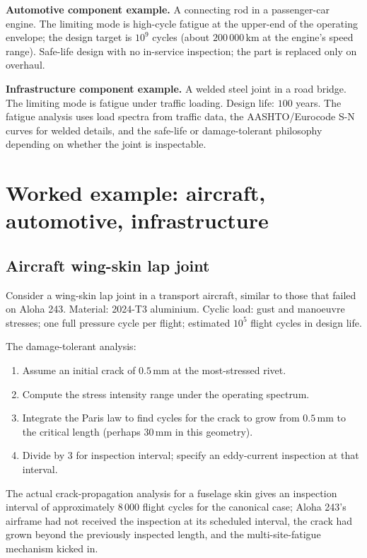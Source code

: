 \textbf{Automotive component example.} A connecting rod in a passenger-car engine. The limiting mode is high-cycle fatigue at the upper-end of the operating envelope; the design target is $10^9$ cycles (about $200\,000\,\si{\kilo\meter}$ at the engine's speed range). Safe-life design with no in-service inspection; the part is replaced only on overhaul.

\textbf{Infrastructure component example.} A welded steel joint in a road bridge. The limiting mode is fatigue under traffic loading. Design life: $100$ years. The fatigue analysis uses load spectra from traffic data, the AASHTO/Eurocode S-N curves for welded details, and the safe-life or damage-tolerant philosophy depending on whether the joint is inspectable.

\section{Worked example: aircraft, automotive, infrastructure}

\subsection{Aircraft wing-skin lap joint}

Consider a wing-skin lap joint in a transport aircraft, similar to those that failed on Aloha 243. Material: 2024-T3 aluminium. Cyclic load: gust and manoeuvre stresses; one full pressure cycle per flight; estimated $10^5$ flight cycles in design life.

The damage-tolerant analysis:
\begin{enumerate}[leftmargin=*]
  \item Assume an initial crack of $0.5\,\si{\milli\meter}$ at the most-stressed rivet.
  \item Compute the stress intensity range under the operating spectrum.
  \item Integrate the Paris law to find cycles for the crack to grow from $0.5\,\si{\milli\meter}$ to the critical length (perhaps $30\,\si{\milli\meter}$ in this geometry).
  \item Divide by 3 for inspection interval; specify an eddy-current inspection at that interval.
\end{enumerate}

The actual crack-propagation analysis for a fuselage skin gives an inspection interval of approximately $8\,000$ flight cycles for the canonical case; Aloha 243's airframe had not received the inspection at its scheduled interval, the crack had grown beyond the previously inspected length, and the multi-site-fatigue mechanism kicked in.


